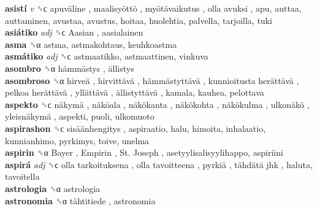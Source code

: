 \textbf{asistí} \emph{v}  ␝ϲ   apuväline ,  maalisyöttö ,  myötävaikutus ,  olla avuksi , apu, auttaa, auttaminen, avustaa, avustus, hoitaa, huolehtia, palvella, tarjoilla, tuki  \\
\textbf{asiátiko} \emph{adj}  ␝ϲ   Aasian , aasialainen  \\
\textbf{asma} ␝α  astma, astmakohtaus, keuhkoastma  \\
\textbf{asmátiko} \emph{adj}  ␝ϲ  astmaatikko, astmaattinen, vinkuva  \\
\textbf{asombro} ␝α   hämmästys ,  ällistys   \\
\textbf{asombroso} ␝α   hirveä ,  hirvittävä ,  hämmästyttävä ,  kunnioitusta herättävä ,  pelkoa herättävä ,  yllättävä ,  ällistyttävä , kamala, kauhea, pelottava  \\
\textbf{aspekto} ␝ϲ   näkymä ,  näköala ,  näkökanta ,  näkökohta ,  näkökulma ,  ulkonäkö ,  yleisnäkymä , aspekti, puoli, ulkomuoto  \\
\textbf{aspirashon} ␝ϲ   sisäänhengitys , aspiraatio, halu, himoita, inhalaatio, kunnianhimo, pyrkimys, toive, unelma  \\
\textbf{aspirin} ␝α   Bayer ,  Empirin ,  St. Joseph , asetyylisalisyylihappo, aspiriini  \\
\textbf{aspirá} \emph{adj}  ␝ϲ   olla tarkoituksena ,  olla tavoitteena ,  pyrkiä ,  tähdätä jhk , haluta, tavoitella  \\
\textbf{astrologia} ␝α  astrologia  \\
\textbf{astronomia} ␝α   tähtitiede , astronomia  \\
